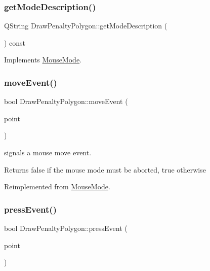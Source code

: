 \subsubsection{\texorpdfstring{getModeDescription()}{getModeDescription()}}
{\footnotesize\ttfamily Q\+String Draw\+Penalty\+Polygon\+::get\+Mode\+Description (\begin{DoxyParamCaption}{ }\end{DoxyParamCaption}) const\hspace{0.3cm}{\ttfamily [virtual]}}



Implements \mbox{\hyperlink{class_mouse_mode_aa442d3058243efe81e8052a137c2072e}{Mouse\+Mode}}.

\mbox{\label{class_draw_penalty_polygon_a7532daff327db9c828c075ab13231058}} 
\subsubsection{\texorpdfstring{moveEvent()}{moveEvent()}}
{\footnotesize\ttfamily bool Draw\+Penalty\+Polygon\+::move\+Event (\begin{DoxyParamCaption}\item[{const Q\+PointF \&}]{point }\end{DoxyParamCaption})\hspace{0.3cm}{\ttfamily [virtual]}}



signals a mouse move event. 

\begin{DoxyReturn}{Returns}
false if the mouse mode must be aborted, true otherwise 
\end{DoxyReturn}


Reimplemented from \mbox{\hyperlink{class_mouse_mode_adb2e2afbb2ac1793a665f1d227e12ce6}{Mouse\+Mode}}.

\mbox{\label{class_draw_penalty_polygon_a52d402862dd2cf9072c6451beee36dc0}} 
\subsubsection{\texorpdfstring{pressEvent()}{pressEvent()}}
{\footnotesize\ttfamily bool Draw\+Penalty\+Polygon\+::press\+Event (\begin{DoxyParamCaption}\item[{const Q\+PointF \&}]{point }\end{DoxyParamCaption})\hspace{0.3cm}{\ttfamily [virtual]}}




